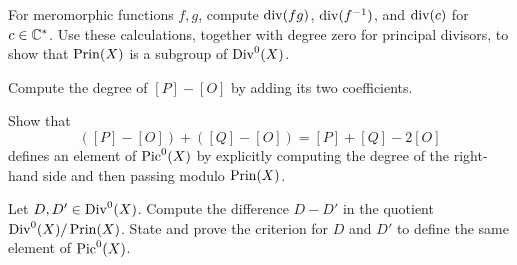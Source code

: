 \begin{exercise}
For meromorphic functions \(f,g\), compute \(\operatorname{div}(fg)\),
\(\operatorname{div}(f^{-1})\), and \(\operatorname{div}(c)\) for \(c\in\mathbb{C}^*\).  Use these
calculations, together with degree zero for principal divisors, to show that
\(\operatorname{Prin}(X)\) is a subgroup of \(\operatorname{Div}^0(X)\).
\end{exercise}

\begin{exercise}
Compute the degree of \([P]-[O]\) by adding its two coefficients.
\end{exercise}

\begin{exercise}
Show that
\[
  ([P]-[O])+([Q]-[O])=[P]+[Q]-2[O]
\]
defines an element of \(\operatorname{Pic}^0(X)\) by explicitly computing the degree of the
right-hand side and then passing modulo \(\operatorname{Prin}(X)\).
\end{exercise}

\begin{exercise}
Let \(D,D'\in\operatorname{Div}^0(X)\).  Compute the difference \(D-D'\) in the quotient
\(\operatorname{Div}^0(X)/\operatorname{Prin}(X)\).  State and prove the criterion for \(D\) and \(D'\) to
define the same element of \(\operatorname{Pic}^0(X)\).
\end{exercise}
